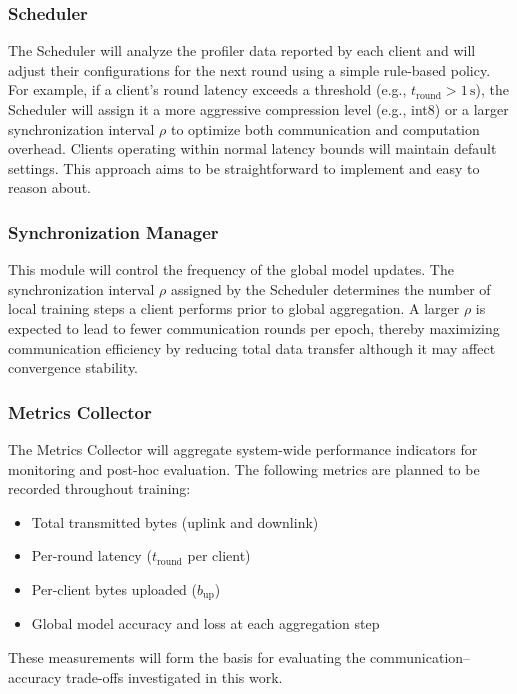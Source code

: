 \documentclass[conference]{IEEEtran}
\begin{document}
\subsubsection{Scheduler}

The Scheduler will analyze the profiler data reported by each client and will adjust their configurations for the next round using a simple rule-based policy. For example, if a client's round latency exceeds a threshold (e.g., $t_{\mathrm{round}} > 1\,\mathrm{s}$), the Scheduler will assign it a more aggressive compression level (e.g., int8) or a larger synchronization interval $\rho$ to optimize both communication and computation overhead. Clients operating within normal latency bounds will maintain default settings. This approach aims to be straightforward to implement and easy to reason about.

\subsubsection{Synchronization Manager}

This module will control the frequency of the global model updates. The synchronization interval $\rho$ assigned by the Scheduler determines the number of local training steps a client performs prior to global aggregation. A larger $\rho$ is expected to lead to fewer communication rounds per epoch, thereby maximizing communication efficiency by reducing total data transfer although it may affect convergence stability.

\subsubsection{Metrics Collector}

The Metrics Collector will aggregate system-wide performance indicators for monitoring and post-hoc evaluation. The following metrics are planned to be recorded throughout training:

\begin{itemize}
  \item Total transmitted bytes (uplink and downlink)
  \item Per-round latency ($t_{\mathrm{round}}$ per client)
  \item Per-client bytes uploaded ($b_{\mathrm{up}}$)
  \item Global model accuracy and loss at each aggregation step
\end{itemize}

These measurements will form the basis for evaluating the communication--accuracy trade-offs investigated in this work.
\end{document}
